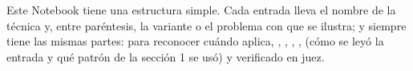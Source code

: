 Este Notebook tiene una estructura simple. Cada entrada lleva el nombre de la
técnica y, entre paréntesis, la variante o el problema con que se ilustra; y siempre tiene
las mismas partes:  para reconocer cuándo aplica,
, , ,
,  (cómo se leyó la entrada y qué
patrón de la sección 1 se usó) y  verificado en juez.
